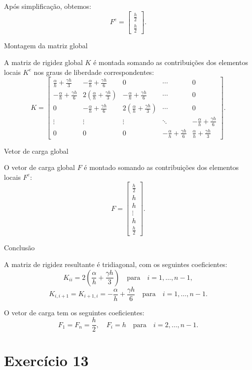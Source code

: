\documentclass{article}
\begin{document}
Após simplificação, obtemos:
\[
F^e = \begin{bmatrix}
\frac{h}{2} \\
\frac{h}{2}
\end{bmatrix}.
\]

 Montagem da matriz global

A matriz de rigidez global \(K\) é montada somando as contribuições dos elementos locais \(K^e\) nos graus de liberdade correspondentes:
\[
K = \begin{bmatrix}
\frac{\alpha}{h} + \frac{\gamma h}{3} & -\frac{\alpha}{h} + \frac{\gamma h}{6} & 0 & \cdots & 0 \\
-\frac{\alpha}{h} + \frac{\gamma h}{6} & 2\left(\frac{\alpha}{h} + \frac{\gamma h}{3}\right) & -\frac{\alpha}{h} + \frac{\gamma h}{6} & \cdots & 0 \\
0 & -\frac{\alpha}{h} + \frac{\gamma h}{6} & 2\left(\frac{\alpha}{h} + \frac{\gamma h}{3}\right) & \cdots & 0 \\
\vdots & \vdots & \vdots & \ddots & -\frac{\alpha}{h} + \frac{\gamma h}{6} \\
0 & 0 & 0 & -\frac{\alpha}{h} + \frac{\gamma h}{6} & \frac{\alpha}{h} + \frac{\gamma h}{3}
\end{bmatrix}.
\]

 Vetor de carga global

O vetor de carga global \(F\) é montado somando as contribuições dos elementos locais \(F^e\):
\[
F = \begin{bmatrix}
\frac{h}{2} \\
h \\
h \\
\vdots \\
h \\
\frac{h}{2}
\end{bmatrix}.
\]

 Conclusão

A matriz de rigidez resultante é tridiagonal, com os seguintes coeficientes:
\[
K_{ii} = 2\left(\frac{\alpha}{h} + \frac{\gamma h}{3}\right) \quad \text{para} \quad i = 1, \ldots, n-1,
\]
\[
K_{i,i+1} = K_{i+1,i} = -\frac{\alpha}{h} + \frac{\gamma h}{6} \quad \text{para} \quad i = 1, \ldots, n-1.
\]

O vetor de carga tem os seguintes coeficientes:
\[
F_1 = F_n = \frac{h}{2}, \quad F_i = h \quad \text{para} \quad i = 2, \ldots, n-1.
\]

\section{Exercício 13}
\end{document}
